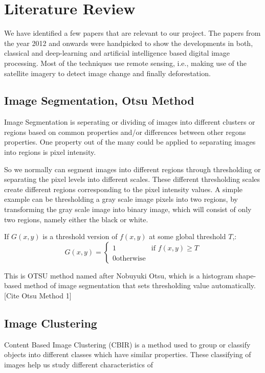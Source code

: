 \documentclass[12pt,a4paper]{article}
\begin{document}
\section{Literature Review}
We have identified a few papers that are relevant to our project. The papers from the year 2012 and onwards were handpicked to show the developments in both, classical and deep-learning and artificial intelligence based digital image processing. Most of the techniques use remote sensing, i.e., making use of the satellite imagery to detect image change and finally deforestation.


\subsection[3.1]{Image Segmentation, Otsu Method}
Image Segmentation is seperating or dividing of images into different clusters or regions based on common properties and/or differences between other regons properties. One property out of the many could be applied to separating images into regions is pixel intensity. 

So we normally can segment images into different regions through thresholding or separating the pixel levels into different scales. These different thresholding scales create different regions corresponding to the pixel intensity values. 
\newline A simple example can be thresholding a gray scale image pixels into two regions, by transforming the gray scale image into binary image, which will consist of only two regions, namely either the black or white.

If $G(x,y)$ is a threshold version of $f(x,y)$ at some global threshold $T$,:
\[G(x,y) =
\begin{cases}
1 & \text{if } f(x,y) \geq T\\
0 \text{otherwise}
\end{cases}
\]

This is OTSU method named after Nobuyuki Otsu, which is a histogram shape-based method of image segmentation that sets thresholding value automatically. [Cite Otsu Method 1]


\subsection[3.2]{Image Clustering} 
Content Based Image Clustering (CBIR) is a method used to group or classify objects into different classes which have similar properties. These classifying of images help us study different characteristics of 
\end{document}
